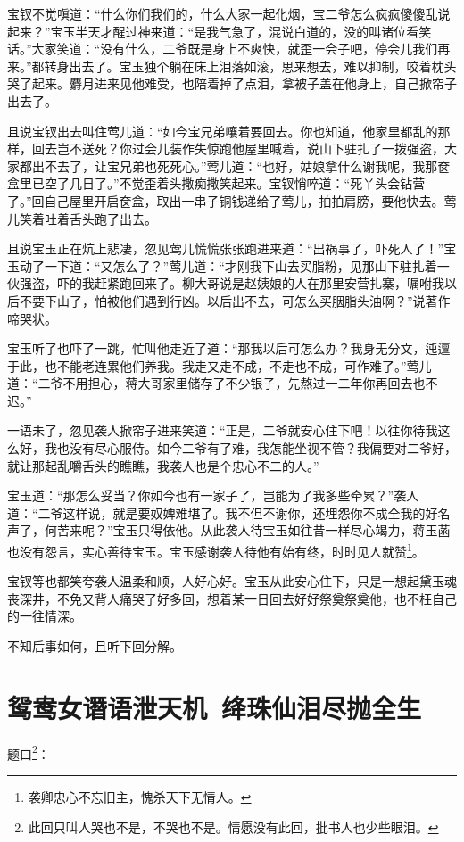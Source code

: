 \documentclass[12pt,oneside]{book}
\begin{document}
宝钗不觉嗔道：“什么你们我们的，什么大家一起化烟，宝二爷怎么疯疯傻傻乱说起来？”宝玉半天才醒过神来道：“是我气急了，混说白道的，没的叫诸位看笑话。”大家笑道：“没有什么，二爷既是身上不爽快，就歪一会子吧，停会儿我们再来。”都转身出去了。宝玉独个躺在床上泪落如滚，思来想去，难以抑制，咬着枕头哭了起来。麝月进来见他难受，也陪着掉了点泪，拿被子盖在他身上，自己掀帘子出去了。

且说宝钗出去叫住莺儿道：“如今宝兄弟嚷着要回去。你也知道，他家里都乱的那样，回去岂不送死？你过会儿装作失惊跑他屋里喊着，说山下驻扎了一拨强盗，大家都出不去了，让宝兄弟也死死心。”莺儿道：“也好，姑娘拿什么谢我呢，我那奁盒里已空了几日了。”不觉歪着头撒痴撒笑起来。宝钗悄啐道：“死丫头会钻营了。”回自己屋里开启奁盒，取出一串子铜钱递给了莺儿，拍拍肩膀，要他快去。莺儿笑着吐着舌头跑了出去。

且说宝玉正在炕上悲凄，忽见莺儿慌慌张张跑进来道：“出祸事了，吓死人了！”宝玉动了一下道：“又怎么了？”莺儿道：“才刚我下山去买脂粉，见那山下驻扎着一伙强盗，吓的我赶紧跑回来了。柳大哥说是赵姨娘的人在那里安营扎寨，嘱咐我以后不要下山了，怕被他们遇到行凶。以后出不去，可怎么买胭脂头油啊？”说著作啼哭状。

宝玉听了也吓了一跳，忙叫他走近了道：“那我以后可怎么办？我身无分文，迍邅于此，也不能老连累他们养我。我走又走不成，不走也不成，可作难了。”莺儿道：“二爷不用担心，蒋大哥家里储存了不少银子，先熬过一二年你再回去也不迟。”

一语未了，忽见袭人掀帘子进来笑道：“正是，二爷就安心住下吧！以往你待我这么好，我也没有尽心服侍。如今二爷有了难，我怎能坐视不管？我偏要对二爷好，就让那起乱嚼舌头的瞧瞧，我袭人也是个忠心不二的人。”

宝玉道：“那怎么妥当？你如今也有一家子了，岂能为了我多些牵累？”袭人道：“二爷这样说，就是要奴婢难堪了。我不但不谢你，还埋怨你不成全我的好名声了，何苦来呢？”宝玉只得依他。从此袭人待宝玉如往昔一样尽心竭力，蒋玉菡也没有怨言，实心善待宝玉。宝玉感谢袭人待他有始有终，时时见人就赞\footnote{袭卿忠心不忘旧主，愧杀天下无情人。}。

宝钗等也都笑夸袭人温柔和顺，人好心好。宝玉从此安心住下，只是一想起黛玉魂丧深井，不免又背人痛哭了好多回，想着某一日回去好好祭奠祭奠他，也不枉自己的一往情深。

不知后事如何，且听下回分解。

 
\chapter{鸳鸯女谮语泄天机~绛珠仙泪尽抛全生}
题曰\footnote{此回只叫人哭也不是，不哭也不是。情愿没有此回，批书人也少些眼泪。}：
\end{document}
